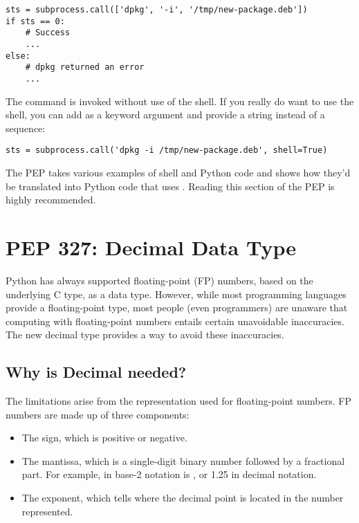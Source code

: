 \documentclass{howto}
\begin{document}
\begin{verbatim}
sts = subprocess.call(['dpkg', '-i', '/tmp/new-package.deb'])
if sts == 0:
    # Success
    ...
else:
    # dpkg returned an error
    ...
\end{verbatim}

The command is invoked without use of the shell.  If you really do want to 
use the shell, you can add  as a keyword argument and provide
a string instead of a sequence:

\begin{verbatim}
sts = subprocess.call('dpkg -i /tmp/new-package.deb', shell=True)
\end{verbatim}

The PEP takes various examples of shell and Python code and shows how
they'd be translated into Python code that uses . 
Reading this section of the PEP is highly recommended.

\begin{seealso}
\end{seealso}


\section{PEP 327: Decimal Data Type}

Python has always supported floating-point (FP) numbers, based on the
underlying C  type, as a data type.  However, while most
programming languages provide a floating-point type, most people (even
programmers) are unaware that computing with floating-point numbers
entails certain unavoidable inaccuracies.  The new decimal type
provides a way to avoid these inaccuracies.

\subsection{Why is Decimal needed?}

The limitations arise from the representation used for floating-point numbers.
FP numbers are made up of three components:

\begin{itemize}
\item The sign, which is positive or negative.
\item The mantissa, which is a single-digit binary number  
followed by a fractional part.  For example,  in base-2 notation
is , or 1.25 in decimal notation.
\item The exponent, which tells where the decimal point is located in the number represented.  
\end{itemize}
\end{document}
